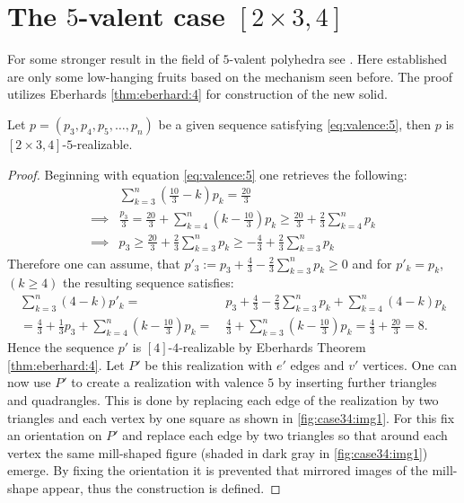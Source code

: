 \section{The $5$-valent case $[2 \times 3, 4]$}
For some stronger result in the field of $5$-valent polyhedra see \cite{trenkler1975face}. Here established are only some low-hanging fruits based on the mechanism seen before. The proof utilizes Eberhards \autoref{thm:eberhard:4} for construction of the new solid.
\begin{theorem}
  Let $p = (p_3, p_4, p_5, \dots, p_n)$ be a given sequence satisfying \autoref{eq:valence:5}, then $p$ is $[2\times3, 4]$-$5$-realizable.
  \begin{proof}
    Beginning with equation \autoref{eq:valence:5} one retrieves the following:
    \begin{align*}
      &\sum_{k=3}^n \left( \frac{10}{3} - k \right) p_k = \frac{20}{3} \\
      \implies & \frac{p_3}{3} = \frac{20}{3} + \sum_{k=4}^n \left(k - \frac{10}{3} \right) p_k \geq \frac{20}{3} + \frac{2}{3} \sum_{k=4}^n p_k \\
      \implies & p_3 \geq \frac{20}{3} + \frac{2}{3} \sum_{k=3}^n p_k \geq - \frac{4}{3} + \frac{2}{3} \sum_{k=3}^n p_k
    \end{align*}
    Therefore one can assume, that $p'_3 := p_3 + \frac{4}{3} - \frac{2}{3} \sum_{k=3}^n p_k \geq 0$ and for $p'_k = p_k$, $(k\geq 4)$ the resulting sequence satisfies:
    \begin{align*}
      \sum_{k=3}^n (4 - k) p'_k =&~ p_3 + \frac{4}{3} - \frac{2}{3} \sum_{k=3}^n p_k + \sum_{k=4}^n (4 - k) p_k \\
      = \frac{4}{3} + \frac{1}{3} p_3 + \sum_{k=4}^n \left(k - \frac{10}{3} \right) p_k =&~ \frac{4}{3} + \sum_{k=3}^n \left(k - \frac{10}{3} \right) p_k = \frac{4}{3} + \frac{20}{3} = 8.
    \end{align*}
    Hence the sequence $p'$ is $[4]$-$4$-realizable by Eberhards Theorem \autoref{thm:eberhard:4}. Let $P'$ be this realization with $e'$ edges and $v'$ vertices. One can now use $P'$ to create a realization with valence $5$ by inserting further triangles and quadrangles. This is done by replacing each edge of the realization by two triangles and each vertex by one square as shown in \autoref{fig:case34:img1}. For this fix an orientation on $P'$ and replace each edge by two triangles so that around each vertex the same mill-shaped figure (shaded in dark gray in \autoref{fig:case34:img1}) emerge. By fixing the orientation it is prevented that mirrored images of the mill-shape appear, thus the construction is defined.


\end{proof}
\end{theorem}
